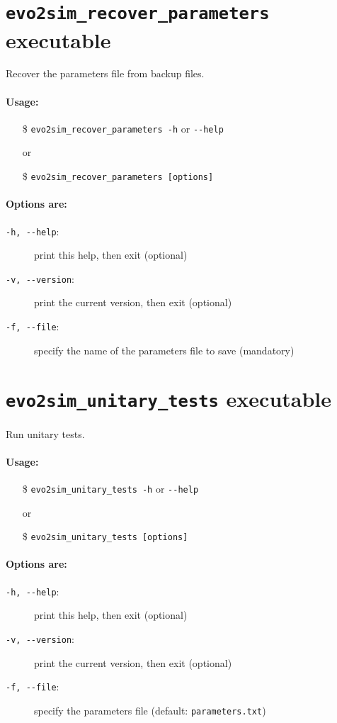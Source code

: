 \section{\texttt{evo2sim\_recover\_parameters} executable}
Recover the parameters file from backup files.
\paragraph{Usage:}
\begin{itemize}
        \item[\$] \texttt{evo2sim\_recover\_parameters -h} or \texttt{-{}-help}
        \item[or]
        \item[\$] \texttt{evo2sim\_recover\_parameters [options]}
\end{itemize}
\paragraph{Options are:}
\begin{description}
        \item[\texttt{-h, -{}-help}:] print this help, then exit (optional)
        \item[\texttt{-v, -{}-version}:] print the current version, then exit (optional)
        \item[\texttt{-f, -{}-file}:] specify the name of the parameters file to save (mandatory)
\end{description}
    
\section{\texttt{evo2sim\_unitary\_tests} executable}
Run unitary tests.
\paragraph{Usage:}
\begin{itemize}
        \item[\$] \texttt{evo2sim\_unitary\_tests -h} or \texttt{-{}-help}
        \item[or]
        \item[\$] \texttt{evo2sim\_unitary\_tests [options]}
\end{itemize}
\paragraph{Options are:}
\begin{description}
        \item[\texttt{-h, -{}-help}:] print this help, then exit (optional)
        \item[\texttt{-v, -{}-version}:] print the current version, then exit (optional)
        \item[\texttt{-f, -{}-file}:] specify the parameters file (default: \texttt{parameters.txt})
\end{description}

